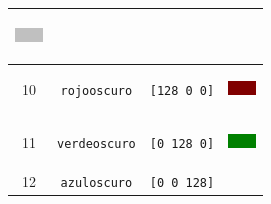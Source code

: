 \begin{center}
\begin{longtable}{|*{4}{c|}}
\begin{minipage}[m]{1.5cm}
\begin{center}
              \includegraphics{Imagenes/05_Primitivas/09_grisclaro.png}
                   \vspace{0.2cm} \end{center}
                              \end{minipage} \\ \hline
   10 & \texttt{rojooscuro} \index{rojooscuro@\texttt{rojooscuro}}
      & \texttt{[128  0   0]} &  \begin{minipage}[m]{1.5cm} \begin{center}
                 \vspace{0.2cm} %
              \includegraphics{Imagenes/05_Primitivas/10_rojooscuro.png}
                   \vspace{0.2cm} \end{center}
                              \end{minipage} \\ \hline
   11 & \texttt{verdeoscuro} \index{verdeoscuro@\texttt{verdeoscuro}}
      & \texttt{[0  128  0]} &  \begin{minipage}[m]{1.5cm} \begin{center}
                 \vspace{0.2cm} %
              \includegraphics{Imagenes/05_Primitivas/11_verdeoscuro.png}
                   \vspace{0.2cm} \end{center}
                              \end{minipage} \\ \hline
   12 & \texttt{azuloscuro} \index{azuloscuro@\texttt{azuloscuro}}
      & \texttt{[0   0  128]} &  \begin{minipage}[m]{1.5cm} \begin{center}
                 \vspace{0.2cm} %

\end{center}
\end{minipage}
\end{longtable}
\end{center}

